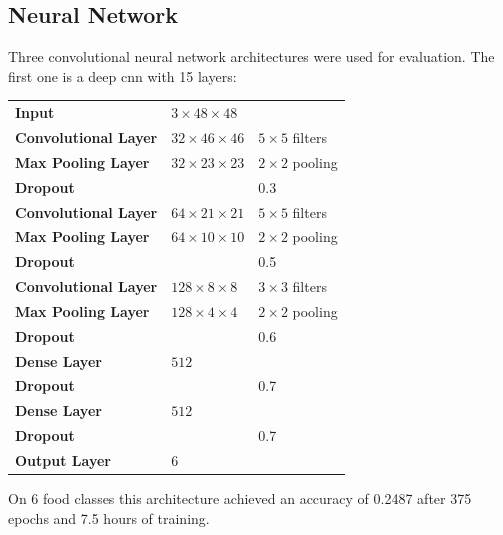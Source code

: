 \subsection{Neural Network}
Three convolutional neural network architectures were used for evaluation. The first one is a deep \gls{cnn} with 15 layers:
\newline \newline
\begin{tabular}{lll}
	\textbf{Input} & $3 \times 48 \times 48$ &  \\ 
	\textbf{Convolutional Layer} & $32 \times 46 \times 46$ & $5 \times 5$ filters\\ 
	\textbf{Max Pooling Layer} & $32 \times 23 \times 23$ & $2 \times 2$ pooling\\ 
	\textbf{Dropout} & & 0.3\\ 
	
	\textbf{Convolutional Layer} & $64 \times 21 \times 21$ & $5 \times 5$ filters\\ 
	\textbf{Max Pooling Layer} & $64 \times 10 \times 10$ & $2 \times 2$ pooling\\ 
	\textbf{Dropout} & & 0.5\\ 
	
	\textbf{Convolutional Layer} & $128 \times 8 \times 8$ & $3 \times 3$ filters\\ 
	\textbf{Max Pooling Layer} & $128 \times 4 \times 4$ & $2 \times 2$ pooling\\ 
	\textbf{Dropout} & & 0.6\\ 
	
	\textbf{Dense Layer} & $512$ & \\ 
	\textbf{Dropout} & & 0.7\\ 
	\textbf{Dense Layer} & $512$ & \\ 
	\textbf{Dropout} & & 0.7\\ 
	
	\textbf{Output Layer} & 6 & \\ 
\end{tabular} 
\newline\newline
On 6 food classes this architecture achieved an accuracy of 0.2487 after 375 epochs and 7.5 hours of training.

